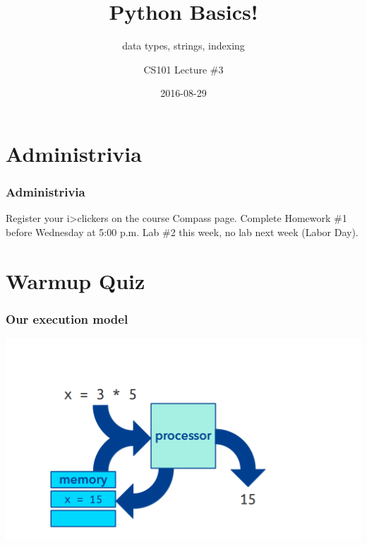 \documentclass[11pt]{beamer}
\title{Python Basics!}
\subtitle{data types, strings, indexing}
\author{CS101 Lecture \#3}
\date{2016-08-29}
\begin{document}
  \setcounter{showProgressBar}{0}
  \setcounter{showSlideNumbers}{0}

\frame{\titlepage}

\setcounter{framenumber}{0}
\setcounter{showProgressBar}{1}
\setcounter{showSlideNumbers}{1}

\section{Administrivia}

\begin{frame}
  \frametitle{Administrivia}
  \Enlarge
  \begin{itemize}
  \myitem  Register your i>clickers on the course Compass page.
  \myitem  Complete Homework \#1 before Wednesday at 5:00 p.m.
  \myitem  Lab \#2 this week, no lab next week (Labor Day).
  \end{itemize}
\end{frame}

\section{Warmup Quiz}

\begin{frame}
  \frametitle{Our execution model}
  \includegraphics[width=\textwidth]{./img/computer-process.png}
\end{frame}
\end{document}
